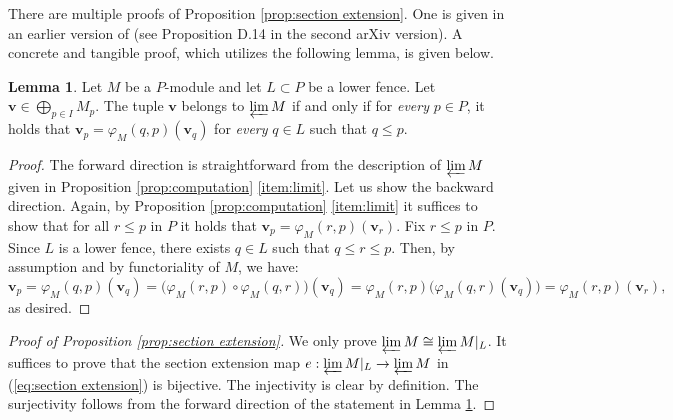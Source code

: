 \documentclass[11pt]{article}
\theoremstyle{definition}
\newtheorem{lemma}[theorem]{Lemma}
\newcommand{\bv}{\mathbf{v}}
\begin{document}
There are multiple proofs of Proposition \ref{prop:section extension}. One is given in an earlier version of \cite{kim2018generalized} (see Proposition D.14 in the second arXiv version). A concrete and tangible proof, which utilizes the following lemma, is given below. 

\begin{lemma}\label{lem:minimal-extent} Let $M$ be a $P$-module and let $L\subset P$ be a lower fence. Let $\bv\in \bigoplus_{p\in I}{M_p}$.
The tuple $\bv$ belongs to $\varprojlim M$ if and only if for  \emph{every} $p\in P$, it holds that $\bv_p=\varphi_M(q,p)(\bv_q)$ for
\emph{every} $q\in L$ such that $q\leq p$. 
\end{lemma}


\begin{proof}
The forward direction is straightforward from the description of $\varprojlim M$ given in Proposition \ref{prop:computation} \ref{item:limit}. Let us show the backward direction. Again, by Proposition \ref{prop:computation} \ref{item:limit} it suffices to show that for all $r\leq p$ in $P$ it holds that $\bv_p=\varphi_M(r,p)(\bv_r)$. Fix $r\leq p$ in $P$. Since $L$ is a lower fence, there exists $q\in  L$ such that $q\leq r\leq p$. Then, by assumption and by functoriality of $M$, we have:
\[\bv_p=\varphi_M(q,p)(\bv_q)=\big(\varphi_M(r,p)\circ \varphi_M(q,r)\big)(\bv_q)=\varphi_M(r,p)\big( \varphi_M(q,r)(\bv_q)\big)=\varphi_M(r,p)(\bv_r),\]
as desired.
\end{proof}



\begin{proof}[Proof of Proposition \ref{prop:section extension}]
We only prove $\varprojlim M \cong \varprojlim M|_L$. It suffices to prove that the section extension map $e:\varprojlim M|_L \rightarrow \varprojlim M$ in (\ref{eq:section extension}) is bijective. The injectivity is clear by definition. The surjectivity follows from the forward direction of the statement in Lemma \ref{lem:minimal-extent}. 
\end{proof}
\end{document}

